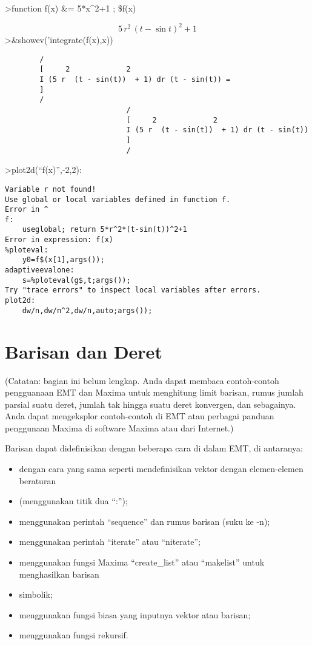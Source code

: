 \documentclass[
]{book}
\begin{document}
\textgreater function f(x) \&= 5*x\^{}2+1 ; \$f(x)

\[5\,r^2\,\left(t-\sin t\right)^2+1\]\textgreater\&showev('integrate(f(x),x))

\begin{verbatim}
        /
        [     2             2
        I (5 r  (t - sin(t))  + 1) dr (t - sin(t)) = 
        ]
        /
                            /
                            [     2             2
                            I (5 r  (t - sin(t))  + 1) dr (t - sin(t))
                            ]
                            /
\end{verbatim}

\textgreater plot2d(``f(x)'',-2,2):

\begin{verbatim}
Variable r not found!
Use global or local variables defined in function f.
Error in ^
f:
    useglobal; return 5*r^2*(t-sin(t))^2+1 
Error in expression: f(x)
%ploteval:
    y0=f$(x[1],args());
adaptiveevalone:
    s=%ploteval(g$,t;args());
Try "trace errors" to inspect local variables after errors.
plot2d:
    dw/n,dw/n^2,dw/n,auto;args());
\end{verbatim}

\chapter{Barisan dan Deret}\label{barisan-dan-deret}

(Catatan: bagian ini belum lengkap. Anda dapat membaca contoh-contoh pengguanaan EMT dan Maxima untuk menghitung limit barisan, rumus jumlah parsial suatu deret, jumlah tak hingga suatu deret konvergen, dan sebagainya. Anda dapat mengeksplor contoh-contoh di EMT atau perbagai panduan penggunaan Maxima di software Maxima atau dari Internet.)

Barisan dapat didefinisikan dengan beberapa cara di dalam EMT, di antaranya:

\begin{itemize}
\item
  dengan cara yang sama seperti mendefinisikan vektor dengan elemen-elemen beraturan
\item
  (menggunakan titik dua ``:'');
\item
  menggunakan perintah ``sequence'' dan rumus barisan (suku ke -n);
\item
  menggunakan perintah ``iterate'' atau ``niterate'';
\item
  menggunakan fungsi Maxima ``create\_list'' atau ``makelist'' untuk menghasilkan barisan
\item
  simbolik;
\item
  menggunakan fungsi biasa yang inputnya vektor atau barisan;
\item
  menggunakan fungsi rekursif.
\end{itemize}
\end{document}
